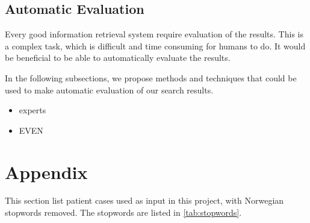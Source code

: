 \documentclass[a4paper, 12pt]{article}
\begin{document}
\subsection{Automatic Evaluation}
Every good information retrieval system require evaluation of the results. This is a complex task, which is difficult and time consuming for humans to do. It would be beneficial to be able to automatically evaluate the results.

In the following subsections, we propose methods and techniques that could be used to make automatic evaluation of our search results.

\begin{itemize}
\item experts
\item EVEN
\end{itemize}


\appendix
\section{Appendix}
\label{appendix}
This section list patient cases used as input in this project, with Norwegian
stopwords removed. The stopwords are listed in \autoref{tab:stopwords}.


\end{document}
